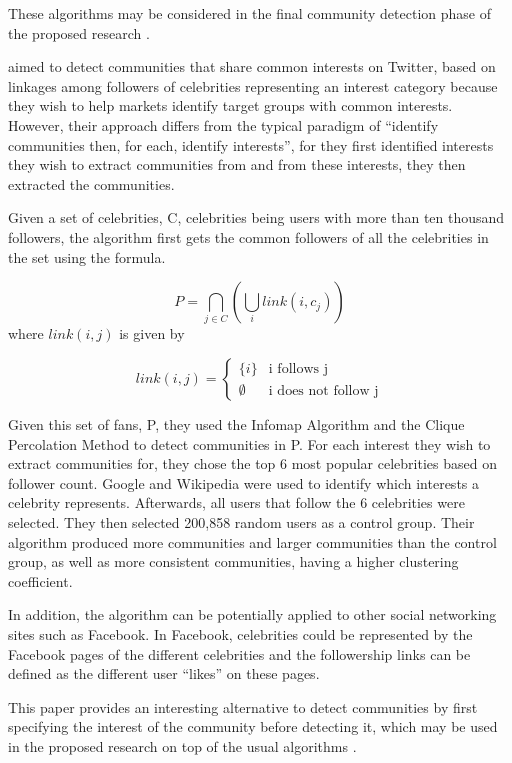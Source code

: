 These algorithms may be considered in the final community detection phase of the proposed research \cite{Tang:2010}.

 aimed to detect communities that share common interests on Twitter, based on linkages among followers of celebrities representing an interest category because they wish to help markets identify target groups with common interests. However, their approach differs from the typical  paradigm of ``identify communities then, for each, identify interests'', for they first identified interests they wish to extract communities from and from these interests, they then extracted the communities. 

Given a set of celebrities, C, celebrities being users with more than ten thousand followers, the algorithm first gets the common followers of all the celebrities in the set using the formula. 

\begin{equation}
P = \bigcap_{j \in C} (\bigcup_i link(i,c_j))
\end{equation}where $link(i,j)$ is given by

\begin{equation}
link(i,j) = \begin{cases}
\{i\} & \text{i follows j} \\
\emptyset & \text{i does not follow j}
\end{cases}
\end{equation}

Given this set of fans, P, they used the Infomap Algorithm and the Clique Percolation Method to detect communities in P. For each interest they wish to extract communities for, they chose the top 6 most popular celebrities based on follower count. Google and Wikipedia were used to identify which interests a celebrity represents. Afterwards, all users that follow the 6 celebrities were selected. They then selected 200,858 random users as a control group. Their algorithm produced more communities and larger communities than the control group, as well as more consistent communities, having a higher clustering coefficient. 

In addition, the algorithm can be potentially applied to other social networking sites such as Facebook. In Facebook, celebrities could be represented by the Facebook pages of the different celebrities and the followership links can be defined as the different user ``likes'' on these pages.

This paper provides an interesting alternative to detect communities by first specifying the interest of the community before detecting it, which may be used in the proposed research on top of the usual algorithms \cite{Lim:2012:1}.

